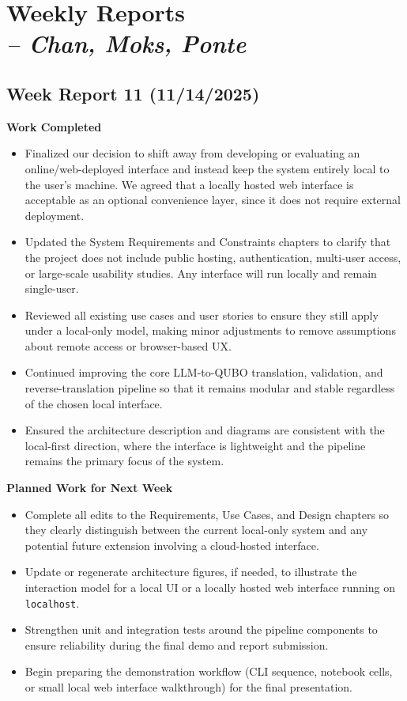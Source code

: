 \chapter{Weekly Reports \\
\small{\textit{-- Chan, Moks, Ponte}}
\label{Chapter::Weekly Reports}}

\section{Week Report 11 (11/14/2025)}
\label{sec::W11}

\textbf{Work Completed}
\begin{itemize}
  \item Finalized our decision to shift away from developing or evaluating an online/web-deployed interface and instead keep the system entirely local to the user’s machine. We agreed that a locally hosted web interface is acceptable as an optional convenience layer, since it does not require external deployment.
  \item Updated the System Requirements and Constraints chapters to clarify that the project does not include public hosting, authentication, multi-user access, or large-scale usability studies. Any interface will run locally and remain single-user.
  \item Reviewed all existing use cases and user stories to ensure they still apply under a local-only model, making minor adjustments to remove assumptions about remote access or browser-based UX.
  \item Continued improving the core LLM-to-QUBO translation, validation, and reverse-translation pipeline so that it remains modular and stable regardless of the chosen local interface.
  \item Ensured the architecture description and diagrams are consistent with the local-first direction, where the interface is lightweight and the pipeline remains the primary focus of the system.
\end{itemize}

\textbf{Planned Work for Next Week}
\begin{itemize}
  \item Complete all edits to the Requirements, Use Cases, and Design chapters so they clearly distinguish between the current local-only system and any potential future extension involving a cloud-hosted interface.
  \item Update or regenerate architecture figures, if needed, to illustrate the interaction model for a local UI or a locally hosted web interface running on \texttt{localhost}.
  \item Strengthen unit and integration tests around the pipeline components to ensure reliability during the final demo and report submission.
  \item Begin preparing the demonstration workflow (CLI sequence, notebook cells, or small local web interface walkthrough) for the final presentation.
\end{itemize}

